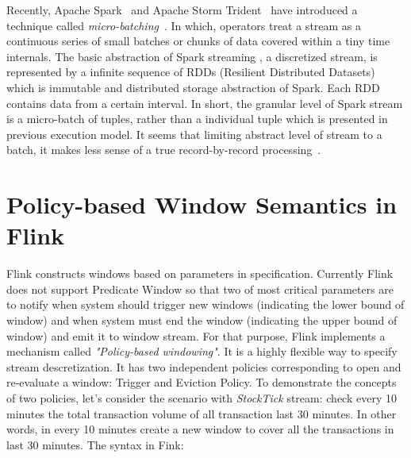 

Recently, Apache Spark~\citep{spark} and Apache Storm Trident~\citep{storm} have introduced a technique called \textit{micro-batching}~\citep{Zaharia:2012}. In which, operators treat a stream as a continuous series of small batches or chunks of data covered within a tiny time internals. The basic abstraction of Spark streaming , a discretized stream,  is represented by a infinite sequence of RDDs (Resilient Distributed Datasets) which is immutable and distributed storage abstraction of Spark. Each RDD contains data from a certain interval. In short, the granular level of Spark stream is a micro-batch of tuples, rather than a individual tuple which is presented in previous execution model. It seems that limiting abstract level of stream to a batch, it makes less sense of a true record-by-record processing~\citep{Shahrivari:2014}.


\section{Policy-based Window Semantics in Flink}


Flink constructs windows based on parameters in specification. Currently Flink does not support Predicate Window so that two of most critical parameters are to notify when system should trigger new windows (indicating the lower bound of window) and when system must end the window (indicating the upper bound of window) and emit it to window stream. For that purpose, Flink implements a mechanism called \textit{"Policy-based windowing"}. It is a highly flexible way to specify stream descretization. It has two independent policies corresponding to open and re-evaluate a window: Trigger and Eviction Policy.
To demonstrate the concepts of two policies, let's consider the scenario with \textit{StockTick} stream: check every 10 minutes the total transaction volume of all transaction last 30 minutes. In other words, in every 10 minutes create a new window to cover all the transactions in last 30 minutes. The syntax in Fink:

